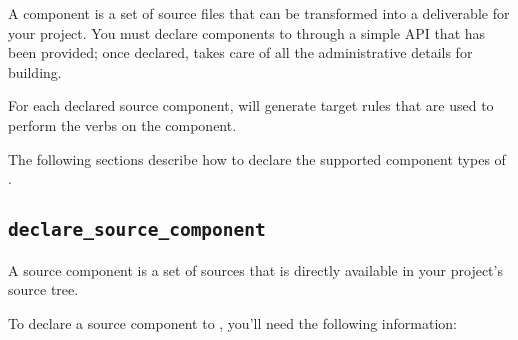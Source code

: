 A component is a set of source files that can be transformed into a
deliverable for your project.  You must declare components to \lmsbw
through a simple API that has been provided; once declared, \lmsbw
takes care of all the administrative details for building.

For each declared source component, \lmsbw will generate target
\makefile rules that are used to perform the \lmsbw verbs on the component.

The following sections describe how to declare the supported
component types of \lmsbw.

\subsection{\texttt{declare\_source\_component}}

A source component is a set of sources that is directly available in
your project's source tree.

To declare a source component to \lmsbw, you'll need the following
information:

